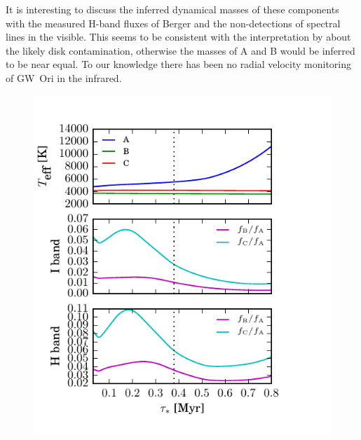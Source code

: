 \documentclass[twocolumn]{aastex61}
\begin{document}
It is interesting to discuss the inferred dynamical masses of these components with the measured H-band fluxes of Berger and the non-detections of spectral lines in the visible. This seems to be consistent with the interpretation by \citet{berger11} about the likely disk contamination, otherwise the masses of A and B would be inferred to be near equal. To our knowledge there has been no radial velocity monitoring of GW~Ori in the infrared.

\begin{figure}[htb]
\begin{center}
  \includegraphics{evolution.pdf}
  \end{center}
\end{figure}
\end{document}
